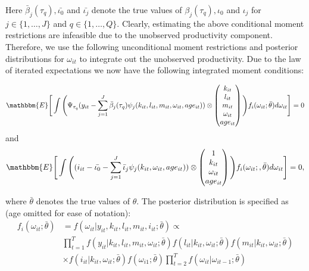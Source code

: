 \documentclass{article}
\begin{document}
Here $\bar{\beta}_{j}(\tau_{q}), \bar{\iota_{0}}$ and $\bar{\iota_{j}}$ denote the true values of $\beta_{j}(\tau_{q}), \iota_{0}$ and $\iota_{j}$ for $j\in\{1,\dots, J\}$ and $q\in\{1,\dots,Q\}$. Clearly, estimating the above conditional moment restrictions are infeasible due to the unobserved productivity component. Therefore, we use the following unconditional moment restrictions and posterior distributions for $\omega_{it}$ to integrate out the unobserved productivity. Due to the law of iterated expectations we now have the following integrated moment conditions:

\begin{equation}\label{yimc}
\mathbbm{E}\Bigg[\int\Bigg(\Psi_{\tau_{q}}(y_{it}-\sum_{j=1}^{J}\bar{\beta}_{j}(\tau_{q})\psi_{j}(k_{it}, l_{it}, m_{it}, \omega_{it}, age_{it}))\otimes
\begin{pmatrix}
k_{it} \\
l_{it}\\
m_{it} \\
\omega_{it} \\
age_{it}
\end{pmatrix}
\Bigg)f_{i}(\omega_{it};\bar{\theta})d\omega_{it}\Bigg]=0
\end{equation}
and 
\begin{equation}\label{iimc}
\begin{split}
\mathbbm{E}\Bigg[\int\Bigg((i_{it}-\bar{\iota_{0}}-\sum_{j=1}^{J}\bar{\iota}_{j}\psi_{j}(k_{it}, \omega_{it}, age_{it}))\otimes
\begin{pmatrix}
1 \\
k_{it} \\
\omega_{it}\\
age_{it}
\end{pmatrix}
\Bigg)f_{i}(\omega_{it};,\bar{\theta})d\omega_{it}\Bigg]=0,
\end{split}
\end{equation}

where $\bar{\theta}$ denotes the true values of $\theta$. The posterior distribution is specified as (age omitted for ease of notation):
\begin{equation}\label{posterior}
\begin{split}
f_{i}(\omega_{it};\bar{\theta})&=f(\omega_{it}|y_{it}, k_{it}, l_{it}, m_{it}, i_{it}; \bar{\theta}) \propto\\
&\prod_{t=1}^{T}f(y_{it}|k_{it}, l_{it}, m_{it}, \omega_{it};\bar{\theta})f(l_{it}|k_{it}, \omega_{it};\bar{\theta})f(m_{it}|k_{it}, \omega_{it};\bar{\theta}) \\
&\times f(i_{it}|k_{it}, \omega_{it};\bar{\theta})f(\omega_{i1};\bar{\theta})\prod_{t=2}^{T}f(\omega_{it}|\omega_{it-1};\bar{\theta})
\end{split}
\end{equation}
\end{document}
